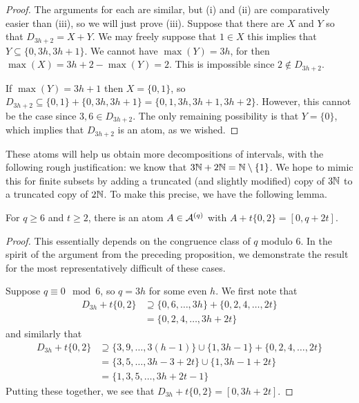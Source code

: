 \begin{proof}
	The arguments for each are similar, but (i) and (ii) are comparatively easier than (iii), so we will just prove (iii).
	Suppose that there are $X$ and $Y$ so that $D_{3h+2} = X + Y$.
	We may freely suppose that $1\in X$ this implies that $Y \subseteq \{0,3h,3h+1\}$.
	We cannot have $\max(Y) = 3h$, for then $\max(X) = 3h+2 - \max(Y) = 2$.
	This is impossible since $2\notin D_{3h+2}$.
	
	If $\max(Y) = 3h+1$ then $X = \{0,1\}$, so $D_{3h+2} \subseteq \{0,1\} + \{0,3h,3h+1\} = \{0,1,3h,3h+1,3h+2\}$.
	However, this cannot be the case since $3,6\in D_{3h+2}$.
	The only remaining possibility is that $Y = \{0\}$, which implies that $D_{3h+2}$ is an atom, as we wished.
\end{proof}

These atoms will help us obtain more decompositions of intervals, with the following rough justification: we know that $3\mathbb{N} + 2\mathbb{N} = \mathbb{N} \setminus\{1\}$. 
We hope to mimic this for finite subsets by adding a truncated (and slightly modified) copy of $3\mathbb{N}$ to a truncated copy of $2\mathbb{N}$.
To make this precise, we have the following lemma.

\begin{lemma} \label{lemma:many 2s types}
	For $q \ge 6$ and $t\ge 2$, there is an atom $A\in \mathcal{A}^{(q)}$ with $A + t\{0,2\} = [ 0, q+2t ]$.
\end{lemma}

\begin{proof}
	This essentially depends on the congruence class of $q$ modulo $6$.
	In the spirit of the argument from the preceding proposition, we demonstrate the result for the most representatively difficult of these cases.
	
	Suppose $q \equiv 0 \mod 6$, so $q = 3h$ for some even $h$.
	We first note that
	\begin{align*}
	D_{3h} + t\{0,2\} 
	&\supseteq \{0,6,\dots, 3h\} + \{0,2,4,\dots, 2t\} \\
	& = \{0,2,4,\dots, 3h+2t \}
	\end{align*}
	and similarly that
	\begin{align*}
	D_{3h} + t\{0,2\}
	&\supseteq \{3,9,\dots, 3(h-1) \}\cup\{1,3h-1\} + \{0,2,4,\dots, 2t \} \\
	&= \{3,5,\dots, 3h-3 + 2t \}\cup \{1,3h-1 + 2t \} \\
	&= \{1,3,5,\dots, 3h+2t-1 \}
	\end{align*}
	Putting these together, we see that $D_{3h} + t\{0,2\} = [ 0,3h+2t ]$.
\end{proof}

